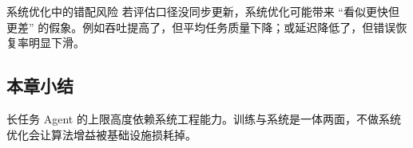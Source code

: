 \begin{warningbox}{系统优化中的错配风险}
若评估口径没同步更新，系统优化可能带来 ``看似更快但更差'' 的假象。例如吞吐提高了，但平均任务质量下降；或延迟降低了，但错误恢复率明显下滑。
\end{warningbox}

\subsection{本章小结}
长任务 Agent 的上限高度依赖系统工程能力。训练与系统是一体两面，不做系统优化会让算法增益被基础设施损耗掉。


